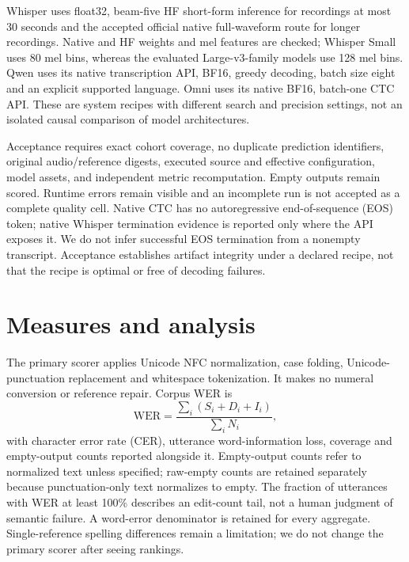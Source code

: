 \documentclass[11pt]{article}
\begin{document}
Whisper uses float32, beam-five HF short-form inference for recordings at most 30 seconds and the accepted official native full-waveform route for longer recordings. Native and HF weights and mel features are checked; Whisper Small uses 80 mel bins, whereas the evaluated Large-v3-family models use 128 mel bins. Qwen uses its native transcription API, BF16, greedy decoding, batch size eight and an explicit supported language. Omni uses its native BF16, batch-one CTC API. These are system recipes with different search and precision settings, not an isolated causal comparison of model architectures.

Acceptance requires exact cohort coverage, no duplicate prediction identifiers, original audio/reference digests, executed source and effective configuration, model assets, and independent metric recomputation. Empty outputs remain scored. Runtime errors remain visible and an incomplete run is not accepted as a complete quality cell. Native CTC has no autoregressive end-of-sequence (EOS) token; native Whisper termination evidence is reported only where the API exposes it. We do not infer successful EOS termination from a nonempty transcript. Acceptance establishes artifact integrity under a declared recipe, not that the recipe is optimal or free of decoding failures.

\section{Measures and analysis}
The primary scorer applies Unicode NFC normalization, case folding, Unicode-punctuation replacement and whitespace tokenization. It makes no numeral conversion or reference repair. Corpus WER is
\[
\mathrm{WER}=\frac{\sum_i(S_i+D_i+I_i)}{\sum_i N_i},
\]
with character error rate (CER), utterance word-information loss, coverage and empty-output counts reported alongside it. Empty-output counts refer to normalized text unless specified; raw-empty counts are retained separately because punctuation-only text normalizes to empty. The fraction of utterances with WER at least 100\% describes an edit-count tail, not a human judgment of semantic failure. A word-error denominator is retained for every aggregate. Single-reference spelling differences remain a limitation; we do not change the primary scorer after seeing rankings.
\end{document}
